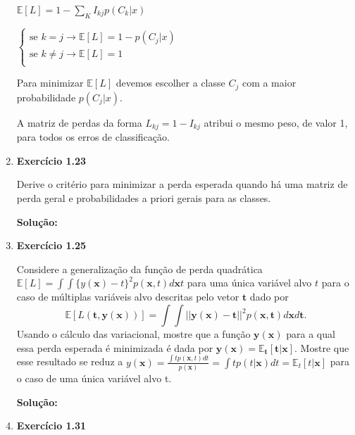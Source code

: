 \begin{enumerate}
$\mathbb{E}[L]=1 - \sum_{K}I_{kj}p(C_k | x)$

$\begin{cases}
    \text{se }k=j \rightarrow \mathbb{E}[L]=1 - p(C_j | x)\\
    \text{se }k\neq j \rightarrow \mathbb{E}[L]=1 \\
\end{cases}$


Para minimizar $\mathbb{E}[L]$ devemos escolher a classe $C_j$ com a maior probabilidade $p(C_j|x)$.

A matriz de perdas da forma $L_{kj} = 1 - I_{kj}$ atribui o mesmo peso, de valor 1, para todos os erros de classificação.\\

\item \textbf{Exercício 1.23} \par

Derive o critério para minimizar a perda esperada quando há uma matriz de perda geral e probabilidades a priori gerais para as classes.
\newline \par
\textbf{Solução:}

\item \textbf{Exercício 1.25} \par

Considere a generalização da função de perda quadrática $\mathbb{E}[L] = \int \int \{y(\boldsymbol{x})-t\}^2p(\boldsymbol{x},t)d\boldsymbol{x}t$ para uma única variável alvo $t$ para o caso de múltiplas variáveis alvo descritas pelo vetor $\boldsymbol{t}$ dado por
\begin{equation*}
    \mathbb{E}[L(\boldsymbol{t},\boldsymbol{y}(\boldsymbol{x}))] = \int \int ||\boldsymbol{y}(\boldsymbol{x})-\boldsymbol{t}||^2p(\boldsymbol{x},\boldsymbol{t})d\boldsymbol{x}d\boldsymbol{t}.
\end{equation*}
Usando o cálculo das variacional, mostre que a função $\boldsymbol{y}(\boldsymbol{x})$ para a qual essa perda esperada é minimizada é dada por $\boldsymbol{y}(\boldsymbol{x}) = \mathbb{E}_{\boldsymbol{t}}[\boldsymbol{t}|\boldsymbol{x}]$. Mostre que esse resultado se reduz a $y(\boldsymbol{x}) = \frac{\int tp(\boldsymbol{x},t)dt}{p(\boldsymbol{x})} = \int tp(t|\boldsymbol{x}) dt = \mathbb{E}_t[t|\boldsymbol{x}]$ para o caso de uma única variável alvo t.
\newline \par
\textbf{Solução:}

\item \textbf{Exercício 1.31} \par


\end{enumerate}
